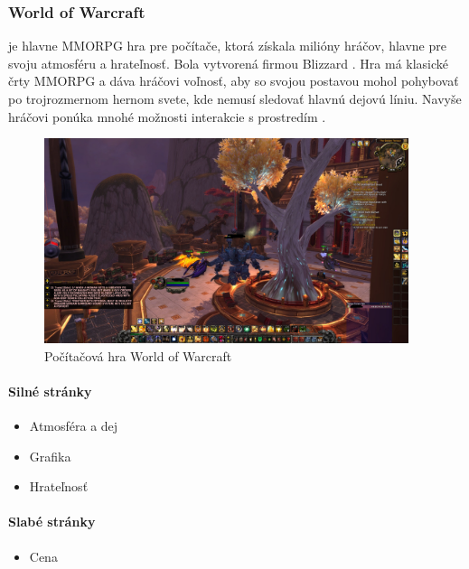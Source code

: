 \subsubsection{World of Warcraft} je hlavne MMORPG hra pre počítače, ktorá získala milióny hráčov, hlavne pre svoju atmosféru a hrateľnosť. Bola vytvorená firmou Blizzard \cite{wow-blizard}. Hra má klasické črty MMORPG a dáva hráčovi voľnosť, aby so svojou postavou mohol pohybovať po trojrozmernom hernom svete, kde nemusí sledovať hlavnú dejovú líniu. Navyše hráčovi ponúka mnohé možnosti interakcie s prostredím \cite{wow-blizard-guide}.
\begin{figure}[h]
  \centering
  \includegraphics[height=6cm]{mainmatter/imgs/wow.jpg}
  \caption{Počítačová hra World of Warcraft}
  \label{fig:wowko}
\end{figure}

\paragraph*{Silné stránky}
\begin{itemize}
  \item Atmosféra a dej
  \item Grafika 
  \item Hrateľnosť 
\end{itemize}
\paragraph*{Slabé stránky}
\begin{itemize}
  \item Cena   
\end{itemize}